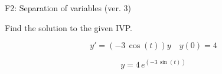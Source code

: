 \begin{exercise}
  \begin{exerciseTitle}F2: Separation of variables (ver. 3)\end{exerciseTitle}
  \begin{exerciseStatement}
    
Find the solution to the given IVP.

    
\[y'=( -3 \, \cos\left(t\right) )y\hspace{1em} y(0)= 4\]

  \end{exerciseStatement}
  \begin{exerciseAnswer}
    
\[y= 4 \, e^{\left(-3 \, \sin\left(t\right)\right)}\]

  \end{exerciseAnswer}
\end{exercise}